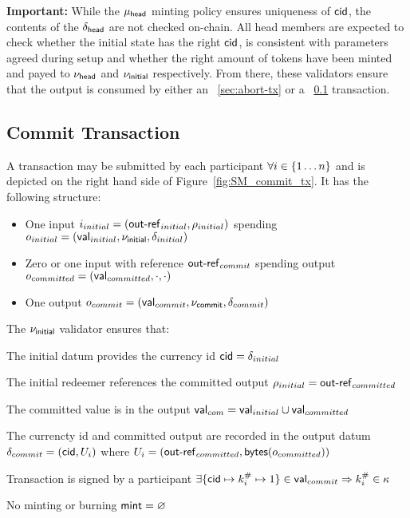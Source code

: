 \noindent \textbf{Important:} While the $\mu_\mathsf{head}$ minting policy ensures
uniqueness of $\mathsf{cid}$, the contents of the $\delta_{\mathsf{head}}$ are not
checked on-chain. All head members are expected to check whether the initial
state has the right $\mathsf{cid}$, is consistent with parameters agreed during setup
and whether the right amount of tokens have been minted and payed to $\nu_\mathsf{head}$
and $\nu_\mathsf{initial}$ respectively. From there, these validators ensure that the
output is consumed by either an \mtxAbort{}~\ref{sec:abort-tx} or a
\mtxCom{}~\ref{sec:commit-tx} transaction.



\subsection{Commit Transaction}\label{sec:commit-tx}

A \mtxCom{} transaction may be submitted by each participant
$\forall i \in \{1 \dots n\}$ and is depicted on the right hand side of
Figure~\ref{fig:SM_commit_tx}. It has the following structure:
\begin{itemize}
  \item One input $i_{initial} = (\mathsf{out\textsf{-}{}ref}_{initial}, \rho_{initial})$
        spending $o_{initial} = (\mathsf{val}_{initial}, \nu_\mathsf{initial}, \delta_{initial})$
  \item Zero or one input with reference
        $\mathsf{out\textsf{-}{}ref}_{commit}$ spending output
        $o_{committed} = (\mathsf{val}_{committed}, \cdot , \cdot)$
  \item One output $o_{commit} = (\mathsf{val}_{commit}, \nu_\mathsf{commit}, \delta_{commit})$
\end{itemize}

\noindent The $\nu_\mathsf{initial}$ validator ensures that:
\begin{menumerate}
  \item The initial datum provides the currency id $\mathsf{cid} = \delta_{initial}$
  \item The initial redeemer references the committed output $\rho_{initial} = \mathsf{out\textsf{-}{}ref}_{committed}$
  \item The committed value is in the output $\mathsf{val}_{com} = \mathsf{val}_{initial} \cup \mathsf{val}_{committed}$
  \item The currencty id and committed output are recorded in the output datum
  $\delta_{commit} = (\mathsf{cid}, U_{i})$ where
  $U_{i} = (\mathsf{out\textsf{-}{}ref}_{committed},\mathsf{bytes}(o_{committed}))$
  \item Transaction is signed by a participant $\exists \{\mathsf{cid} \mapsto k^{\#}_{i} \mapsto 1\} \in \mathsf{val}_{commit} \Rightarrow k^{\#}_{i} \in \kappa$
  \item No minting or burning  $\mathsf{mint} = \varnothing$
\end{menumerate}

